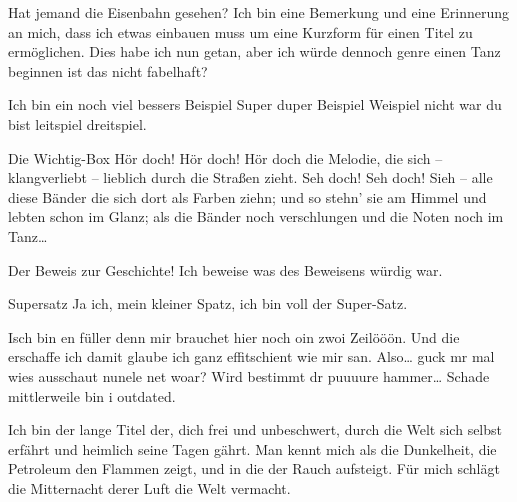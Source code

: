 \documentclass[twocolumn]{scrartcl}
\begin{document}
    \blindtext[2]

    \begin{bemerkung}{Hat jemand die Eisenbahn gesehen?}
        Ich bin eine Bemerkung und eine Erinnerung an mich, dass ich etwas einbauen
        muss um eine Kurzform für einen Titel zu ermöglichen. Dies habe ich nun getan, aber ich würde dennoch genre einen Tanz beginnen ist das nicht fabelhaft?
    \end{bemerkung}

    \blindtext

    \begin{beispiel}{Ich bin ein noch viel bessers Beispiel}
        \label{bei:beiref}Super duper Beispiel Weispiel nicht war du bist leitspiel dreitspiel.
    \end{beispiel}

    \blindtext

    \begin{definition*}{Die Wichtig-Box}
        Hör doch! Hör doch! Hör doch die Melodie, die sich -- klangverliebt -- lieblich durch die Straßen zieht. 
        Seh doch! Seh doch! Sieh -- alle diese Bänder die sich dort
        als Farben ziehn; und so stehn' sie am Himmel und lebten
        schon im Glanz; als die Bänder noch verschlungen und
        die Noten noch im Tanz\ldots
    \end{definition*}

    \blindtext

    \begin{beweis}{Der Beweis zur Geschichte!}
        Ich beweise was des Beweisens würdig war.
    \end{beweis}

    \blindtext[1]

    \begin{satz}{Supersatz}
        Ja ich, mein kleiner Spatz, ich bin voll der Super-Satz.
    \end{satz}

    Isch bin en füller denn mir brauchet hier noch oin zwoi Zeilööön.  Und die erschaffe ich damit glaube ich ganz effitschient wie mir san. Also\ldots{} guck mr mal wies ausschaut nunele net woar? Wird bestimmt dr puuuure hammer\ldots
    Schade mittlerweile bin i outdated.
    \begin{definition}{Ich bin der lange Titel der, dich frei und unbeschwert, durch die Welt sich selbst erfährt und heimlich seine Tagen gährt.}
        Man kennt mich als die Dunkelheit, die Petroleum den Flammen zeigt, und in die der Rauch aufsteigt.
        Für mich schlägt die Mitternacht derer Luft die Welt
        vermacht.
    \end{definition}
\end{document}
